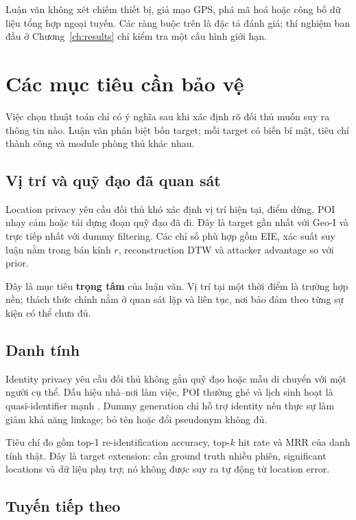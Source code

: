 \documentclass[12pt,a4paper,oneside]{report}
\newcommand{\core}{\textcolor{reportred}{\textbf{trọng tâm}}}
\begin{document}
Luận văn không xét chiếm thiết bị, giả mạo GPS, phá mã hoá hoặc công bố dữ liệu tổng hợp ngoại tuyến. Các ràng buộc trên là đặc tả đánh giá; thí nghiệm ban đầu ở Chương~\ref{ch:results} chỉ kiểm tra một cấu hình giới hạn.

\chapter{Các mục tiêu cần bảo vệ}
\label{ch:targets}

Việc chọn thuật toán chỉ có ý nghĩa sau khi xác định rõ đối thủ muốn suy ra thông tin nào. Luận văn phân biệt bốn target; mỗi target có biến bí mật, tiêu chí thành công và module phòng thủ khác nhau.

\section{Vị trí và quỹ đạo đã quan sát}

Location privacy yêu cầu đối thủ khó xác định vị trí hiện tại, điểm dừng, POI nhạy cảm hoặc tái dựng đoạn quỹ đạo đã đi. Đây là target gần nhất với Geo-I và trực tiếp nhất với dummy filtering. Các chỉ số phù hợp gồm EIE, xác suất suy luận nằm trong bán kính $r$, reconstruction DTW và attacker advantage so với prior.

Đây là mục tiêu \core{} của luận văn. Vị trí tại một thời điểm là trường hợp nền; thách thức chính nằm ở quan sát lặp và liên tục, nơi bảo đảm theo từng sự kiện có thể chưa đủ.

\section{Danh tính}

Identity privacy yêu cầu đối thủ không gắn quỹ đạo hoặc mẫu di chuyển với một người cụ thể. Dấu hiệu nhà--nơi làm việc, POI thường ghé và lịch sinh hoạt là quasi-identifier mạnh \citep{demontjoye2013unique}. Dummy generation chỉ hỗ trợ identity nếu thực sự làm giảm khả năng linkage; bỏ tên hoặc đổi pseudonym không đủ.

Tiêu chí đo gồm top-1 re-identification accuracy, top-$k$ hit rate và MRR của danh tính thật. Đây là target extension: cần ground truth nhiều phiên, significant locations và dữ liệu phụ trợ; nó không được suy ra tự động từ location error.

\section{Tuyến tiếp theo}
\end{document}
